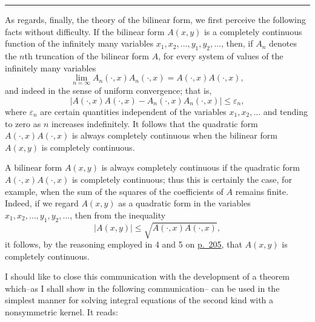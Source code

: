 \documentclass[b5paper,twoside]{article}
\newcommand{\originalpage}[1]{\phantomsection\label{origpage:#1}}
\begin{document}
\begin{center}
  \rule{0.22\linewidth}{0.4pt}
\end{center}

As regards, finally, the theory of the bilinear form, we first perceive the
following facts without difficulty. If the bilinear form $A(x,y)$ is a
completely continuous function of the infinitely many variables
$x_1,x_2,\ldots,y_1,y_2,\ldots$, then, if $A_n$ denotes the $n$th truncation
of the bilinear form $A$, for every system of values of the infinitely many
variables
\[
  \lim_{n=\infty}
  A_n(\mathord{\cdot},x)A_n(\mathord{\cdot},x)
  =A(\mathord{\cdot},x)A(\mathord{\cdot},x),
\]
and indeed in the sense of uniform convergence; that is,
\begin{equation}
  \left\lvert
  A(\mathord{\cdot},x)A(\mathord{\cdot},x)
  -A_n(\mathord{\cdot},x)A_n(\mathord{\cdot},x)
  \right\rvert\leq\varepsilon_n,
  \tag{92}\label{eq:92}
\end{equation}
where $\varepsilon_n$ are certain quantities independent of the variables
$x_1,x_2,\ldots$ and tending to zero as $n$ increases indefinitely. It
follows that the quadratic form
$A(\mathord{\cdot},x)A(\mathord{\cdot},x)$ is always completely continuous
when the bilinear form $A(x,y)$ is completely continuous.

A bilinear form $A(x,y)$ is always completely continuous if the quadratic
form $A(\mathord{\cdot},x)A(\mathord{\cdot},x)$ is completely continuous;
thus this is certainly the case, for example, when the sum of the squares of
the coefficients of $A$ remains finite. Indeed, if we regard $A(x,y)$ as a
quadratic form in the variables $x_1,x_2,\ldots,y_1,y_2,\ldots$, then from
the inequality
\[
  \lvert A(x,y)\rvert
  \leq\sqrt{A(\mathord{\cdot},x)A(\mathord{\cdot},x)},
\]
it follows, by the reasoning employed in 4 and 5 on
\hyperref[origpage:205]{p.~205}, that $A(x,y)$ is completely continuous.

I should like to close this communication with the development of a theorem
which--as I shall show in the following communication--
\originalpage{219}
can be used in the simplest manner for solving integral equations of the
second kind with a nonsymmetric kernel. It reads:
\end{document}

